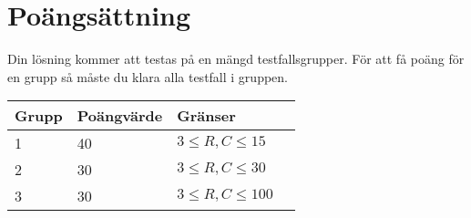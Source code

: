 \section*{Poängsättning}
Din lösning kommer att testas på en mängd testfallsgrupper. För att få poäng för en grupp
så måste du klara alla testfall i gruppen.

\begin{tabular}{| l | l | l | l |}
\hline
Grupp & Poängvärde & Gränser \\ \hline
1 & 40 & $3 \le R,C \le 15$ \\ \hline
2 & 30 & $3 \le R,C \le 30$ \\ \hline
3 & 30 & $3 \le R,C \le 100$ \\ \hline
\end{tabular}
